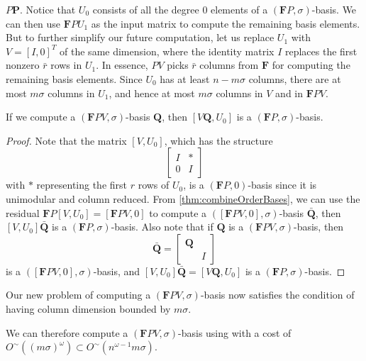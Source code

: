$P\mathbf{P}$. Notice that $U_{0}$ consists of all the degree 0
elements of a $\left(\mathbf{F}P,\sigma\right)$-basis. We can then
use $\mathbf{F}PU_{1}$ as the input matrix to compute the remaining
basis elements. But to further simplify our future computation, let
us replace $U_{1}$ with $V=\left[I,0\right]^{T}$ of the same dimension,
where the identity matrix $I$ replaces the first nonzero $\bar{r}$
rows in $U_{1}$. In essence, $PV$ picks $\bar{r}$ columns from
$\mathbf{F}$ for computing the remaining basis elements. Since $U_{0}$
has at least $n-m\sigma$ columns, there are at most $m\sigma$ columns
in $U_{1}$, and hence at most $m\sigma$ columns in $V$ and in $\mathbf{F}PV$. 
\begin{lem}
\begin{comment}
Let If $\bar{F}P\left[U_{2},U_{0}\right]$ is in the reduced column
echelon form of $\bar{F}$ with $U_{0}$ being a nullspace basis of
$\bar{F}P$, and i
\end{comment}
If we compute a $\left(\mathbf{F}PV,\sigma\right)$-basis $\mathbf{Q}$,
then $\left[V\mathbf{Q},U_{0}\right]$ is a $\left(\mathbf{F}P,\sigma\right)$-basis.\end{lem}
\begin{proof}
Note that the matrix $\left[V,U_{0}\right]$, which has the structure
\[
\begin{bmatrix}I & *\\
0 & I
\end{bmatrix}
\]
 with $*$ representing the first $r$ rows of $U_{0}$, is a $\left(\mathbf{F}P,0\right)$-basis
since it is unimodular and column reduced. From \ref{thm:combineOrderBases},
we can use the residual $\mathbf{F}P[V,U_{0}]=\left[\mathbf{F}PV,0\right]$
to compute a $\left(\left[\mathbf{F}PV,0\right],\sigma\right)$-basis
$\bar{\mathbf{Q}}$, then $[V,U_{0}]\bar{\mathbf{Q}}$ is a $\left(\mathbf{F}P,\sigma\right)$-basis.
Also note that if $\mathbf{Q}$ is a $\left(\mathbf{F}PV,\sigma\right)$-basis,
then 
\[
\bar{\mathbf{Q}}=\begin{bmatrix}\mathbf{Q}\\
 & I
\end{bmatrix}
\]
 is a $\left(\left[\mathbf{F}PV,0\right],\sigma\right)$-basis, and
$[V,U_{0}]\bar{\mathbf{Q}}=\left[V\mathbf{Q},U_{0}\right]$ is a $\left(\mathbf{F}P,\sigma\right)$-basis.
\end{proof}
Our new problem of computing a $\left(\mathbf{F}PV,\sigma\right)$-basis
now satisfies the condition of having column dimension bounded by
$m\sigma$.%
\begin{comment}
\begin{lem}
The column dimensions of $V$ and $\mathbf{F}PV$ are bounded by $m\sigma$.\end{lem}
\begin{proof}
The rank of $\bar{F}$ is bounded by $m\sigma$. This means its nullspace
basis $U_{0}$ has at least $n-m\sigma$ columns. Therefore $V$ has
at most $m\sigma$ columns.\end{proof}
\end{comment}
{} We can therefore compute a $\left(\mathbf{F}PV,\sigma\right)$-basis
using  with a cost of $O^{\sim}\left(\left(m\sigma\right)^{\omega}\right)\subset O^{\sim}\left(n^{\omega-1}m\sigma\right)$.

